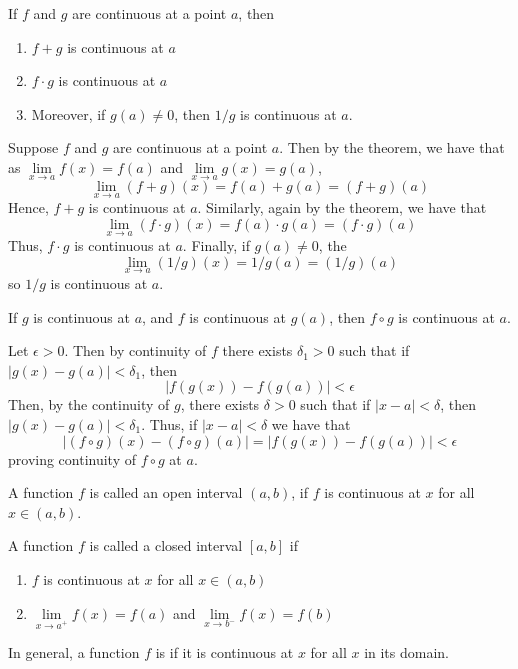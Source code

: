 \documentclass[12pt]{report}
\begin{document}
\begin{thm}{}{}
    If $f$ and $g$ are continuous at a point $a$, then \begin{enumerate}
        \item $f+g$ is continuous at $a$
        \item $f\cdot g$ is continuous at $a$
        \item Moreover, if $g(a) \neq 0$, then $1/g$ is continuous at $a$.
    \end{enumerate}
\end{thm}
\begin{proof*}{}{}
    Suppose $f$ and $g$ are continuous at a point $a$. Then by the  theorem, we have that as $\lim\limits_{x\rightarrow a}f(x) = f(a)$ and $\lim\limits_{x\rightarrow a}g(x) = g(a)$, $$\lim\limits_{x\rightarrow a}(f+g)(x) = f(a) + g(a) = (f+g)(a)$$
    Hence, $f+g$ is continuous at $a$. Similarly, again by the  theorem, we have that $$\lim\limits_{x\rightarrow a}(f\cdot g)(x) = f(a) \cdot g(a) = (f\cdot g)(a)$$
    Thus, $f\cdot g$ is continuous at $a$.
    Finally, if $g(a) \neq 0$, the $$\lim\limits_{x\rightarrow a}(1/g)(x) = 1/g(a) = (1/g)(a)$$
    so $1/g$ is continuous at $a$.
\end{proof*}


\begin{thm}{}{}
    If $g$ is continuous at $a$, and $f$ is continuous at $g(a)$, then $f\circ g$ is continuous at $a$.
\end{thm}
\begin{proof*}{}{}
    Let $\epsilon > 0$. Then by continuity of $f$ there exists $\delta_1 > 0$ such that if $|g(x) - g(a)| < \delta_1$, then $$|f(g(x)) - f(g(a))| < \epsilon$$
    Then, by the continuity of $g$, there exists $\delta > 0$ such that if $|x-a| < \delta$, then $|g(x) - g(a)| < \delta_1$. Thus, if $|x-a| < \delta$ we have that $$|(f\circ g)(x) - (f\circ g)(a)| = |f(g(x)) - f(g(a))| < \epsilon$$
    proving continuity of $f\circ g$ at $a$.
\end{proof*}


\begin{defn}{}{}
    A function $f$ is called  an open interval $(a,b)$, if $f$ is continuous at $x$ for all $x \in (a,b)$.

    A function $f$ is called  a closed interval $[a,b]$ if \begin{enumerate}
        \item $f$ is continuous at $x$ for all $x \in (a,b)$
        \item $\lim\limits_{x\rightarrow a^+}f(x) = f(a)$ and $\lim\limits_{x\rightarrow b^-}f(x) = f(b)$
    \end{enumerate}

    In general, a function $f$ is  if it is continuous at $x$ for all $x$ in its domain.
\end{defn}
\end{document}
